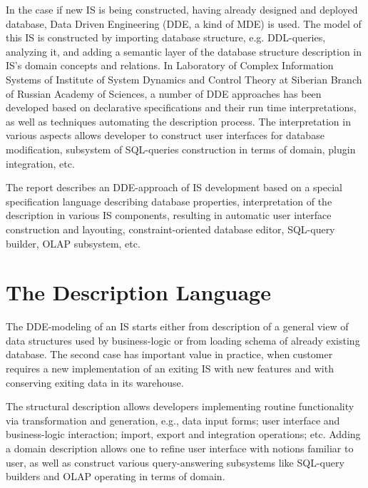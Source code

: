 \documentclass[conference]{IEEEtran}
\newcommand{\e}[2][fcolor]{\textcolor{pcolor}{[}\textcolor{#1}{#2}\textcolor{pcolor}{]}}
\begin{document}
In the case if new IS is being constructed, having already designed and deployed database, Data Driven Engineering (DDE, a kind of MDE) is used.  The model of this IS is constructed by importing database structure, e.g. DDL-queries, analyzing it, and adding a semantic layer of the database structure description in IS's domain concepts and relations.  In Laboratory of Complex Information Systems of Institute of System Dynamics and Control Theory at Siberian Branch of Russian Academy of Sciences, a number of DDE approaches has been developed based on declarative specifications and their run time interpretations, as well as techniques automating the description process.  The interpretation in various aspects allows developer to construct user interfaces for database modification, subsystem of SQL-queries construction in terms of domain, plugin integration, etc.

The report describes an DDE-approach of IS development based on a special specification language describing database properties, interpretation of the description in various IS components, resulting in automatic user interface construction and layouting, constraint-oriented database editor, SQL-query builder, OLAP subsystem, etc.

\section{The Description Language}
\label{sec:description-database}


The DDE-modeling of an IS starts either from description of a general view of data structures used by business-logic or from loading schema of already existing database.  The second case has important value in practice, when customer requires a new implementation of an exiting IS with new features and with conserving exiting data in its warehouse.

The structural description allows developers implementing routine functionality via transformation and generation, e.g., data input forms; user interface and business-logic interaction; import, export and integration operations; etc.  Adding a domain description allows one to refine user interface with notions familiar to user, as well as construct various query-answering subsystems like SQL-query builders and OLAP operating in terms of domain.
\end{document}
